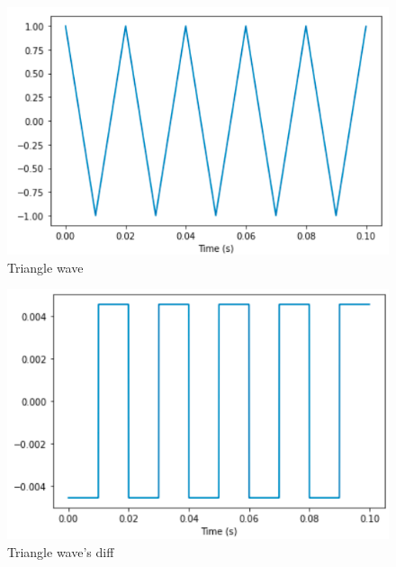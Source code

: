 \documentclass[a4paper]{article}
\begin{document}
        \begin{figure}[H]
            \centering
            \includegraphics[width=\textwidth]{img/p2_1.png}
            \caption{Triangle wave}
            \label{fig:part1_1_2}
        \end{figure}
        
        \begin{figure}[H]
            \centering
            \includegraphics[width=\textwidth]{img/p2_2.png}
            \caption{Triangle wave's diff}
            \label{fig:part1_1_2}
        \end{figure}
        
\end{document}
